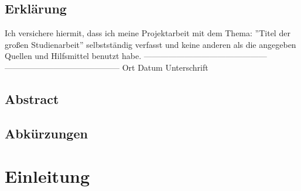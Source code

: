\documentclass[12pt, a4paper]{scrbook}
\begin{document}

\setlength{\parindent}{0em} 
\renewcommand\thechapter{\Roman{chapter}}
\let\cleardoublepage\relax





\section*{Erklärung}

Ich versichere hiermit, dass ich meine Projektarbeit mit dem Thema: ''Titel der großen Studienarbeit'' selbstständig verfasst und keine anderen als die angegeben Quellen und Hilfsmittel benutzt
habe.
\newline
\newline
\newline
\newline
---------------------------------------------       ------------------------------------------ \newline
Ort	\hspace{2cm}		Datum\hspace{3,5 cm}				    Unterschrift
\newpage
\section*{Abstract}


\newpage
\begingroup
\renewcommand*{\chapterpagestyle}{empty}
\pagestyle{empty}
\tableofcontents
\listoffigures





\section*{Abkürzungen}

\begin{acronym}[Bash]
\end{acronym}
\endgroup
\newpage
\pagestyle{plain}
\setcounter{page}{1}





\chapter{Einleitung}
\end{document}
